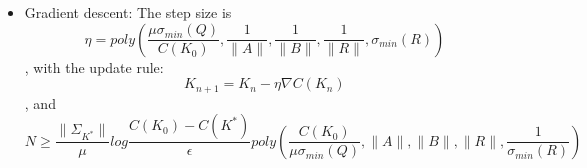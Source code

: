 \begin{theorem}
\begin{itemize}
\item Gradient descent:\newline
The step size is 
\begin{equation}
\eta = poly(\frac{\mu\sigma_{min}(Q)}{C(K_0)},\frac{1}{\|A\|},\frac{1}{\|B\|},\frac{1}{\|R\|},\sigma_{min}(R))
\end{equation}\newline
, with the update rule:
\begin{equation}
{K_{n+1}} = {K_n} - \eta\nabla{C}({K_n})
\end{equation}\newline
, and 
\begin{equation}
N\geq\frac{\|\Sigma_{K^*}\|}{\mu}log\frac{C(K_0)-C(K^*)}{\epsilon}poly(\frac{C(K_0)}{\mu\sigma_{min}(Q)},\|A\|,\|B\|,\|R\|,\frac{1}{\sigma_{min}(R)})
\end{equation}\newline
\end{itemize}
\end{theorem}

